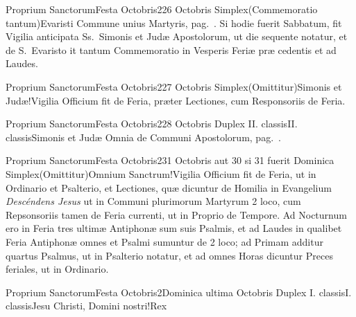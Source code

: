 \documentclass[nocturnale-romanum.tex]{subfiles}
\begin{document}
	{Proprium Sanctorum}{Festa Octobris}{2}{26 Octobris}
	{Simplex}{(Commemoratio tantum)}{Evaristi}
	{Commune unius Martyris, pag.\ \pageref{M-UMEX}. Si hodie fuerit Sabbatum, fit Vigilia anticipata Ss.\ Simonis et Judæ Apostolorum, ut die sequente notatur, et de S.\ Evaristo it tantum Commemoratio in Vesperis Feriæ præ cedentis et ad Laudes.}
	{}

	{Proprium Sanctorum}{Festa Octobris}{2}{27 Octobris}
	{Simplex}{(Omittitur)}{Simonis et Judæ!Vigilia}
	{Officium fit de Feria, præter Lectiones, cum Responsoriis de Feria.}
	{}

	{Proprium Sanctorum}{Festa Octobris}{2}{28 Octobris}
	{Duplex II. classis}{II. classis}{Simonis et Judæ}
	{Omnia de Communi Apostolorum, pag.\ \pageref{M-APEX}.}
	{}

	{Proprium Sanctorum}{Festa Octobris}{2}{31 Octobris aut 30 si 31 fuerit Dominica}
	{Simplex}{(Omittitur)}{Omnium Sanctrum!Vigilia}
	{Officium fit de Feria, ut in Ordinario et Psalterio, et Lectiones, quæ dicuntur de Homilia in Evangelium \emph{Descéndens Jesus} ut in Communi plurimorum Martyrum 2 loco, cum Repsonsoriis tamen de Feria currenti, ut in Proprio de Tempore. Ad Nocturnum ero in Feria  tres ultimæ Antiphonæ sum suis Psalmis, et ad Laudes in qualibet Feria Antiphonæ omnes et Psalmi sumuntur de 2 loco; ad Primam additur quartus Psalmus, ut in Psalterio notatur, et ad omnes Horas dicuntur Preces feriales, ut in Ordinario.}
	{}

	{Proprium Sanctorum}{Festa Octobris}{2}{Dominica ultima Octobris}
	{Duplex I. classis}{I. classis}{Jesu Christi, Domini nostri!Rex}
	{}
	{}
\tedeumrubric
\end{document}
